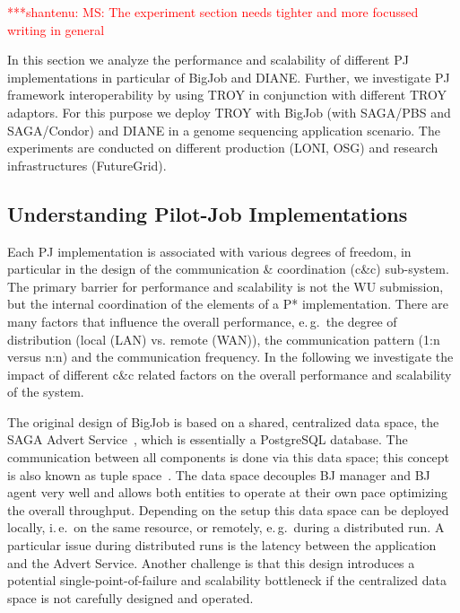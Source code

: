 \documentclass[conference,final]{IEEEtran}
\newcommand{\jhanote}[1]{ {\textcolor{red} { ***shantenu: #1 }}}
\newcommand{\jhanote}[1]{}
\begin{document}
\jhanote{MS: The experiment section needs tighter and more focussed
  writing in general}

In this section we analyze the performance and scalability of different PJ
implementations in particular of BigJob and DIANE. Further, we investigate PJ
framework interoperability by using TROY in conjunction with different TROY 
adaptors. For this purpose we deploy TROY with BigJob (with SAGA/PBS and 
SAGA/Condor) and DIANE in a genome sequencing application scenario. The 
experiments are conducted on different production (LONI, OSG) and research
infrastructures (FutureGrid).

\subsection{Understanding Pilot-Job Implementations}

Each PJ implementation is associated with various degrees of freedom, in
particular in the design of the communication \& coordination (c\&c) sub-system.
The primary barrier for performance and scalability is not the WU submission,
but the internal coordination of the elements of a P* implementation. There are
many factors that influence the overall performance, e.\,g.\ the degree of
distribution (local (LAN) vs. remote (WAN)), the communication pattern (1:n
versus n:n) and the communication frequency. In the following we investigate the
impact of different c\&c related factors on the overall performance and
scalability of the system.

The original design of BigJob is based on a shared, centralized data space, the
SAGA Advert Service~\cite{saga_advert}, which is essentially a PostgreSQL
database. The communication between all components is done via this data space;
this concept is also known as tuple space~\cite{Gelernter:1985:GCL:2363.2433}.
The data space decouples BJ manager and BJ agent very well and allows both
entities to operate at their own pace optimizing the overall throughput.
Depending on the setup this data space can be deployed locally, i.\,e.\ on the
same resource, or remotely, e.\,g.\ during a distributed run. A particular issue
during distributed runs is the latency between the application and the Advert
Service. Another challenge is that this design introduces a potential
single-point-of-failure and scalability bottleneck if the centralized data space
is not carefully designed and operated. 
\end{document}
